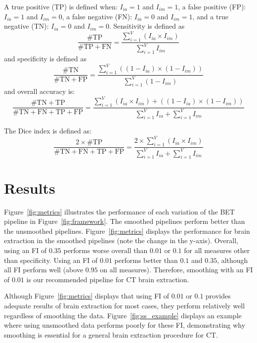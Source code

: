 \documentclass{article}\usepackage[]{graphicx}\usepackage[]{color}
\begin{document}
A true positive (TP) is defined when: $I_{ia} = 1$ and $I_{im} = 1$, a false positive (FP): $I_{ia} = 1$ and $I_{im} = 0$, a false negative (FN): $I_{ia} = 0$ and $I_{im} = 1$, and a true negative (TN): $I_{ia} = 0$ and $I_{im} = 0$.
Sensitivity is defined as
$$
\frac{\# \text{TP} }{\# \text{TP} + \text{FN}} = \frac{ \sum_{i=1}^{V} \left( I_{ia} \times I_{im}\right) }{ \sum_{i=1}^{V} I_{im}}
$$
and specificity is defined as
$$
\frac{\# \text{TN} }{\# \text{TN} + \text{FP}} = \frac{ \sum_{i=1}^{V} \left( (1-I_{ia}) \times (1- I_{im} ) \right) }{ \sum_{i=1}^{V} (1 - I_{im} )}
$$
and overall accuracy is:
$$
\frac{\# \text{TN} + \text{TP} }{\# \text{TN} + \text{FN} + \text{TP} + \text{FP}} = \frac{ \sum_{i=1}^{V} (I_{ia} \times I_{im}) + \left( (1-I_{ia}) \times (1- I_{im} ) \right) }{\sum_{i=1}^{V} I_{ia}  + \sum_{i=1}^{V} I_{im}}
$$


The Dice index is defined as:
$$
\frac{2 \times \#\text{TP} }{ \# \text{TN} + \text{FN} + \text{TP} + \text{FP}} = \frac{ 2 \times \sum_{i=1}^{V} \left( I_{ia} \times I_{im}\right) }{\sum_{i=1}^{V} I_{ia}  + \sum_{i=1}^{V} I_{im}}
$$

\section{Results}
Figure~\ref{fig:metrics}\protect{} illustrates the performance of each variation of the BET pipeline in Figure~\ref{fig:framework}.  The smoothed pipelines perform better than the unsmoothed pipelines.  Figure~\ref{fig:metrics}\protect{} displays the performance for brain extraction in the smoothed pipelines (note the change in the y-axis).  Overall, using an FI of $0.35$ performs worse overall than $0.01$ or $0.1$ for all measures other than specificity.  Using an FI of $0.01$ performs better than $0.1$ and $0.35$, although all FI perform well (above $0.95$ on all measures).  Therefore, smoothing with an FI of $0.01$ is our recommended pipeline for CT brain extraction.

Although Figure~\ref{fig:metrics} displays that using FI of $0.01$ or $0.1$ provides adequate results of brain extraction for most cases, they perform relatively well regardless of smoothing the data.  Figure~\ref{fig:ss_example} displays an example where using unsmoothed data performs poorly for these FI, demonstrating why smoothing is essential for a general brain extraction procedure for CT.
\end{document}

